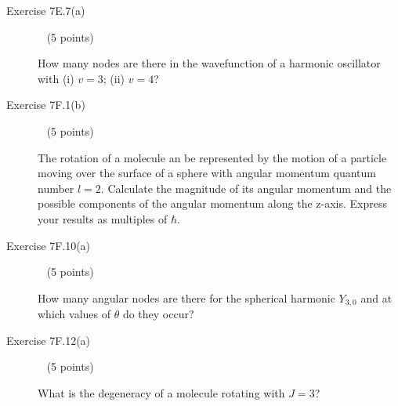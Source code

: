 \documentclass[10pt, letterpaper]{memoir}
\begin{document}
\begin{description}
	\vspace{15em}
	\item [Exercise 7E.7(a)] ~ (5 points)
	
	How many nodes are there in the wavefunction of a harmonic oscillator with (i) $v=3$; (ii) $v=4$?
	
	\vspace{10em}
	\item [Exercise 7F.1(b)] ~ (5 points)
	
	The rotation of a molecule an be represented by the motion of a particle moving over the surface of a sphere with angular momentum quantum number $l=2$. Calculate the magnitude of its angular momentum and the possible components of the angular momentum along the z-axis. Express your results as multiples of $\hbar$.
	
	\vspace{10em}
	\item [Exercise 7F.10(a)] ~ (5 points)
	
	How many angular nodes are there for the spherical harmonic $Y_{3,0}$ and at which values of $\theta$ do they occur?
	
	\vspace{10em}
	\item [Exercise 7F.12(a)] ~ (5 points)
	
	What is the degeneracy of a molecule rotating with $J=3$?
	
\end{description}
\end{document}
